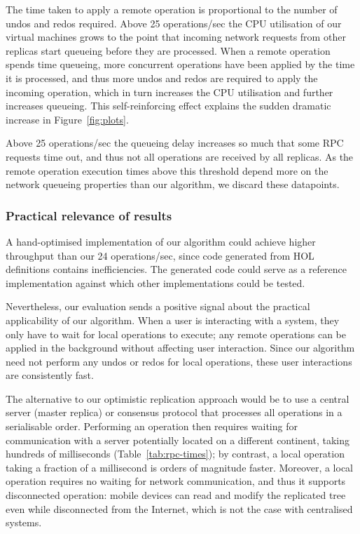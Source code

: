 \documentclass[sigplan,anonymous]{acmart}
\begin{document}
The time taken to apply a remote operation is proportional to the number of undos and redos required.
Above 25 operations/sec the CPU utilisation of our virtual machines grows to the point that incoming network requests from other replicas start queueing before they are processed.
When a remote operation spends time queueing, more concurrent operations have been applied by the time it is processed, and thus more undos and redos are required to apply the incoming operation, which in turn increases the CPU utilisation and further increases queueing.
This self-reinforcing effect explains the sudden dramatic increase in Figure~\ref{fig:plots}.

Above 25 operations/sec the queueing delay increases so much that some RPC requests time out, and thus not all operations are received by all replicas.
As the remote operation execution times above this threshold depend more on the network queueing properties than our algorithm, we discard these datapoints.

\subsubsection{Practical relevance of results}

A hand-optimised implementation of our algorithm could achieve higher throughput than our 24 operations/sec, since code generated from HOL definitions contains inefficiencies.
The generated code could serve as a reference implementation against which other implementations could be tested.

Nevertheless, our evaluation sends a positive signal about the practical applicability of our algorithm.
When a user is interacting with a system, they only have to wait for local operations to execute; any remote operations can be applied in the background without affecting user interaction.
Since our algorithm need not perform any undos or redos for local operations, these user interactions are consistently fast.

The alternative to our optimistic replication approach would be to use a central server (master replica) or consensus protocol that processes all operations in a serialisable order.
Performing an operation then requires waiting for communication with a server potentially located on a different continent, taking hundreds of milliseconds (Table~\ref{tab:rpc-times}); by contrast, a local operation taking a fraction of a millisecond is orders of magnitude faster.
Moreover, a local operation requires no waiting for network communication, and thus it supports disconnected operation: mobile devices can read and modify the replicated tree even while disconnected from the Internet, which is not the case with centralised systems.
\end{document}
